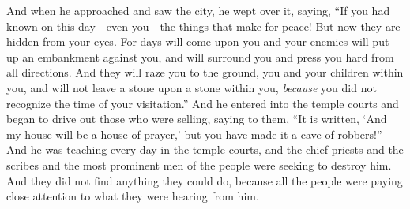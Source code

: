 \begin{biblechapter}
 And when he approached and saw the city, he wept over it,
\verse saying, “If you had known on this day—even you—the things that make for peace! But now they are hidden from your eyes.
\verse For days will come upon you and your enemies will put up an embankment against you, and will surround you and press you hard from all directions.
\verse And they will raze you to the ground, you and your children within you, and will not leave a stone upon a stone within you, \textit{because} you did not recognize the time of your visitation.”
 And he entered into the temple courts and began to drive out those who were selling,
\verse saying to them, “It is written, ‘And my house will be a house of prayer,’ but you have made it a cave of robbers!”
\verse And he was teaching every day in the temple courts, and the chief priests and the scribes and the most prominent men of the people were seeking to destroy him.
\verse And they did not find anything they could do, because all the people were paying close attention to what they were hearing from him.
\end{biblechapter}

